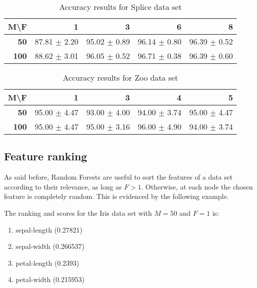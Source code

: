\documentclass[journal, a4paper]{IEEEtran}
\begin{document}
\begin{table}[htbp]
\caption{Accuracy results for Splice data set}
\begin{center}
\begin{tabular}{|r|r|r|r|r|}
\hline
\textbf{M\textbackslash{}F} & \textbf{1} & \textbf{3} & \textbf{6} & \textbf{8} \\ \hline
\textbf{50} & 87.81 $ \pm $ 2.20 & 95.02 $ \pm $ 0.89 & 96.14 $ \pm $ 0.80 & 96.39 $ \pm $ 0.52 \\ \hline
\textbf{100} & 88.62 $ \pm $ 3.01 & 96.05 $ \pm $ 0.52 & 96.71 $ \pm $ 0.38 & 96.39 $ \pm $ 0.60 \\ \hline
\end{tabular}
\end{center}
\label{tab:acc-splice}
\end{table}

\begin{table}[htbp]
\caption{Accuracy results for Zoo data set}
\begin{center}
\begin{tabular}{|r|r|r|r|r|}
\hline
\textbf{M\textbackslash{}F} & \textbf{1} & \textbf{3} & \textbf{4} & \textbf{5} \\ \hline
\textbf{50} & 95.00 $ \pm $ 4.47 & 93.00 $ \pm $ 4.00 & 94.00 $ \pm $ 3.74 & 95.00 $ \pm $ 4.47 \\ \hline
\textbf{100} & 95.00 $ \pm $ 4.47 & 95.00 $ \pm $ 3.16 & 96.00 $ \pm $ 4.90 & 94.00 $ \pm $ 3.74 \\ \hline
\end{tabular}
\end{center}
\label{tab:acc-zoo}
\end{table}

\subsection{Feature ranking}

As said before, Random Forests are useful to sort the features of a data set according
to their relevance, as long as $ F > 1 $. Otherwise, at each node the chosen feature is
completely random. This is evidenced by the following example.

The ranking and scores for the Iris data set with $ M = 50 $ and $ F = 1 $ is:
\begin{enumerate}
\item sepal-length (0.27821)
\item sepal-width (0.266537)
\item petal-length (0.2393)
\item petal-width (0.215953)
\end{enumerate}
\end{document}
